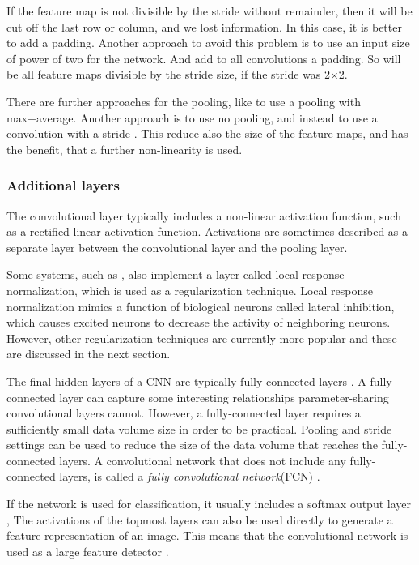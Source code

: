 If the feature map is not divisible by the stride without remainder, then it will be cut off the last row or column, and we lost information. In this case, it is better to add a padding. Another approach to avoid this problem is to use an input size of power of two for the network. And add to all convolutions a padding. So will be all feature maps divisible by the stride size, if the stride was 2×2.

There are further approaches for the pooling, like to use a pooling with max+average. Another approach is to use no pooling, and instead to use a convolution with a stride \cite{springenberg2014striving}. This reduce also the size of the feature maps, and has the benefit, that a further non-linearity is used.



\subsubsection*{Additional layers}
The convolutional layer typically includes a non-linear activation function, such as a rectified linear activation function. Activations are sometimes described as a separate layer between the convolutional layer and the pooling layer.

Some systems, such as \cite{simonyan2014very}, also implement a layer called local response normalization, which is used as a regularization technique. Local response normalization mimics a function of biological neurons called lateral inhibition, which causes excited neurons to decrease the activity of neighboring neurons. However, other regularization techniques are currently more popular and these are discussed in the next section.

The final hidden layers of a CNN are typically fully-connected layers \cite{bishop2006pattern}. A fully-connected layer can capture some interesting relationships parameter-sharing convolutional layers cannot. However, a fully-connected layer requires a sufficiently small data volume size in order to be practical. Pooling and stride settings can be used to reduce the size of the data volume that reaches the fully-connected layers. A convolutional network that does not include any fully-connected layers, is called a \textit{fully convolutional network}(FCN) \cite{ren2015faster}.

If the network is used for classification, it usually includes a softmax output layer \cite{bishop2006pattern}, The activations of the topmost layers can also be used directly to generate a feature representation of an image. This means that the convolutional network is used as a large feature detector \cite{lecun1989backpropagation}.

